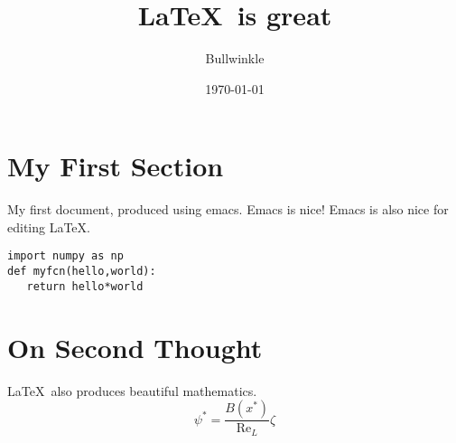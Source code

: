 \documentclass{article}
\begin{document}
\lstset{language=Python}

\title{\LaTeX\ is great}
\author{Bullwinkle}
\date{\today}
\maketitle

\tableofcontents

\section{My First Section}

My first document, produced using emacs.  Emacs is nice!
Emacs is also nice for editing \LaTeX.

\begin{lstlisting}
import numpy as np
def myfcn(hello,world):
   return hello*world
\end{lstlisting}

\section{On Second Thought}

\LaTeX\ also  produces beautiful mathematics.
\begin{equation}
\psi^\ast = \frac{B(x^\ast)}{\mathrm{Re}_L}\zeta
\end{equation}
\end{document}
